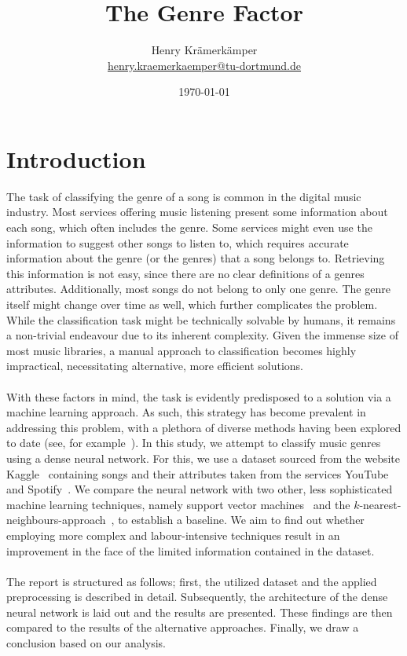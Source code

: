 \documentclass[
  12pt,
  bibliography=totoc,     %
  captions=tableheading,  %
  titlepage=firstiscover, %
]{scrartcl}
\author{%
  Henry Krämerkämper\\%
  \href{mailto:henry.kraemerkaemper@tu-dortmund.de}{henry.kraemerkaemper@tu-dortmund.de}%
}
\title{The Genre Factor}
\date{\today}
\begin{document}
\maketitle
\thispagestyle{empty}
\tableofcontents
\newpage
{}

\section{Introduction}
The task of classifying the genre of a song is common in the digital music industry. Most services
offering music listening present some information about each song, which often includes the genre.
Some services might even use the information to suggest other songs to listen to, which requires
accurate information about the genre (or the genres) that a song belongs to. Retrieving this
information is not easy, since there are no clear definitions of a genres attributes. Additionally,
most songs do not belong to only one genre. The genre itself might change over time as well, which
further complicates the problem. While the classification task might be technically solvable by humans,
it remains a non-trivial endeavour due to its inherent complexity. Given the immense size of most
music libraries, a manual approach to classification becomes highly impractical, necessitating alternative,
more efficient solutions. \\
\\
\noindent
With these factors in mind, the task is evidently predisposed to a solution via a machine learning approach.
As such, this strategy has become prevalent in addressing this problem, with a plethora of diverse methods having been explored to date
(see, for example~\cite{Übersicht2011}).
In this study, we attempt to classify music genres using a dense neural network. For this, we use a dataset sourced
from the website Kaggle~\cite{Kaggle} containing songs and their attributes taken from the services YouTube~\cite{Youtube}
and Spotify~\cite{Spotify}. We compare the neural network with two other, less sophisticated machine learning techniques,
namely support vector machines~\cite{SupportVector} and the $k$-nearest-neighbours-approach~\cite{NearestNeighbours},
to establish a baseline. We aim to find out whether employing more complex and labour-intensive techniques result in an
improvement in the face of the limited information contained in the dataset. \\
\\
\noindent
The report is structured as follows; first, the utilized dataset and the applied preprocessing is described in detail.
Subsequently, the architecture of the dense neural network is laid out and the results are presented. These findings are then
compared to the results of the alternative approaches. Finally, we draw a conclusion based on our analysis.
\end{document}

